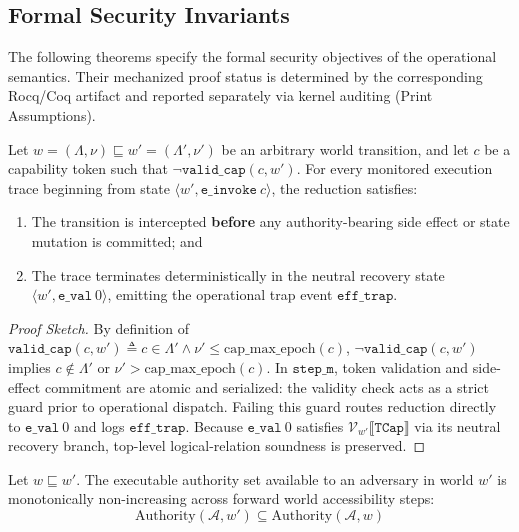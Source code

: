 \subsection{Formal Security Invariants}

The following theorems specify the formal security objectives of the operational semantics. Their mechanized proof status is determined by the corresponding Rocq/Coq artifact and reported separately via kernel auditing (Print Assumptions).

\begin{theorem}
\label{thm:non_bypassability}
Let $w = (\Lambda, \nu) \sqsubseteq w' = (\Lambda', \nu')$ be an arbitrary world transition, and let $c$ be a capability token such that $\neg\mathtt{valid\_cap}(c, w')$. For every monitored execution trace beginning from state $\langle w', \mathtt{e\_invoke}~c \rangle$, the reduction satisfies:
\begin{enumerate}
    \item The transition is intercepted \textbf{before} any authority-bearing side effect or state mutation is committed; and
    \item The trace terminates deterministically in the neutral recovery state $\langle w', \mathtt{e\_val}~0 \rangle$, emitting the operational trap event $\mathtt{eff\_trap}$.
\end{enumerate}
\end{theorem}

\begin{proof}[Proof Sketch]
By definition of $\mathtt{valid\_cap}(c, w') \triangleq c \in \Lambda' \land \nu' \le \text{cap\_max\_epoch}(c)$, $\neg\mathtt{valid\_cap}(c, w')$ implies $c \notin \Lambda'$ or $\nu' > \text{cap\_max\_epoch}(c)$. In $\mathtt{step\_m}$, token validation and side-effect commitment are atomic and serialized: the validity check acts as a strict guard prior to operational dispatch. Failing this guard routes reduction directly to $\mathtt{e\_val}~0$ and logs $\mathtt{eff\_trap}$. Because $\mathtt{e\_val}~0$ satisfies $\mathcal{V}_{w'} \llbracket \mathtt{TCap} \rrbracket$ via its neutral recovery branch, top-level logical-relation soundness is preserved.
\end{proof}

\begin{theorem}
\label{thm:containment}
Let $w \sqsubseteq w'$. The executable authority set available to an adversary in world $w'$ is monotonically non-increasing across forward world accessibility steps:
\[
\text{Authority}(\mathcal{A}, w') \subseteq \text{Authority}(\mathcal{A}, w)
\]
\end{theorem}

